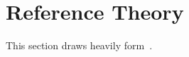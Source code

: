 
\section{Reference Theory}
\label{sec:ref-theory}
This section draws heavily form~\cite{roisin2010GFD}.






